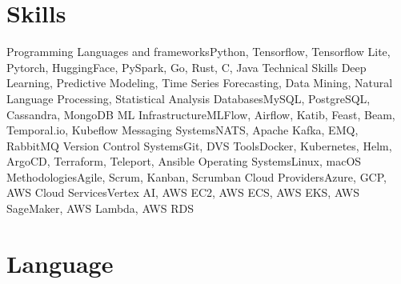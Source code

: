 \section{Skills}

\cvline%
{Programming Languages and frameworks}{Python, Tensorflow, Tensorflow Lite, Pytorch, HuggingFace, PySpark, Go, Rust, C, Java}
\cvline%
{Technical Skills} {Deep Learning, Predictive Modeling, Time Series Forecasting, Data Mining, Natural Language Processing, Statistical Analysis}
\cvline%
{Databases}{MySQL, PostgreSQL, Cassandra, MongoDB}
\cvline%
{ML Infrastructure}{MLFlow, Airflow, Katib, Feast, Beam, Temporal.io, Kubeflow}
\cvline%
{Messaging Systems}{NATS, Apache Kafka, EMQ, RabbitMQ}
\cvline%
{Version Control Systems}{Git, DVS}
\cvline%
{Tools}{Docker, Kubernetes, Helm, ArgoCD, Terraform, Teleport, Ansible}
\cvline%
{Operating Systems}{Linux, macOS}
\cvline%
{Methodologies}{Agile, Scrum, Kanban, Scrumban}
\cvline%
{Cloud Providers}{Azure, GCP, AWS}
\cvline%
{Cloud Services}{Vertex AI, AWS EC2, AWS ECS, AWS EKS, AWS SageMaker, AWS Lambda, AWS RDS}

\section{Language}


\emptysection{}\closesection{}

